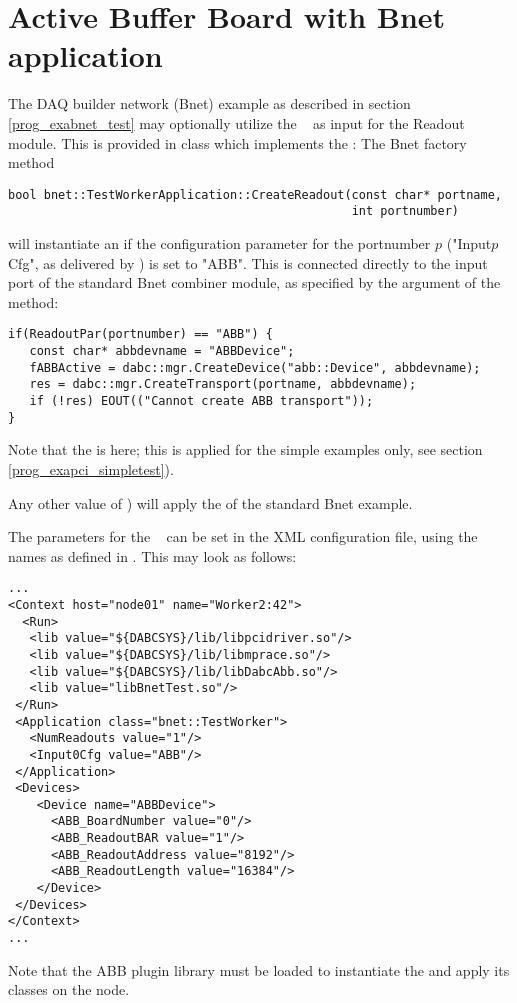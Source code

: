 \section{Active Buffer Board with Bnet application}
\label{prog_exapci_bnet}
The DAQ builder network (Bnet) example as described in section
\ref{prog_exabnet_test} may optionally utilize the \ABB~
as input for the Readout module. This is provided in
class   which implements
the : 
The Bnet factory method 
\begin{small}
\begin{verbatim}
bool bnet::TestWorkerApplication::CreateReadout(const char* portname, 
                                                int portnumber)
\end{verbatim}
\end{small}
will instantiate an 
if the configuration parameter for the portnumber $p$ 
("Input$p$Cfg", as delivered by ) is set to "ABB".
This  is connected  
directly to the input port of the standard Bnet combiner module, as specified by
the  argument of the method:

\begin{small}
\begin{verbatim}
if(ReadoutPar(portnumber) == "ABB") {
   const char* abbdevname = "ABBDevice";
   fABBActive = dabc::mgr.CreateDevice("abb::Device", abbdevname);
   res = dabc::mgr.CreateTransport(portname, abbdevname);
   if (!res) EOUT(("Cannot create ABB transport"));
} 
\end{verbatim}
\end{small}

Note that the  is  here; 
this is applied for the simple examples only, 
see section \ref{prog_exapci_simpletest}). 

Any other value of ) will
apply the  of the standard Bnet example. 

The parameters for the \ABB~
can be set in the XML configuration file, using the names as defined
in . This may look as follows:

\begin{small}
\begin{verbatim}
...
<Context host="node01" name="Worker2:42">
  <Run>
   <lib value="${DABCSYS}/lib/libpcidriver.so"/>          
   <lib value="${DABCSYS}/lib/libmprace.so"/>
   <lib value="${DABCSYS}/lib/libDabcAbb.so"/>          
   <lib value="libBnetTest.so"/>
 </Run> 
 <Application class="bnet::TestWorker">
   <NumReadouts value="1"/>
   <Input0Cfg value="ABB"/>
 </Application>
 <Devices>        
    <Device name="ABBDevice">
      <ABB_BoardNumber value="0"/>
      <ABB_ReadoutBAR value="1"/> 
      <ABB_ReadoutAddress value="8192"/>
      <ABB_ReadoutLength value="16384"/> 
    </Device>
 </Devices>      
</Context>
...
\end{verbatim}
\end{small}

Note that the ABB plugin library  must be loaded
to instantiate the  and apply its classes on the node.


